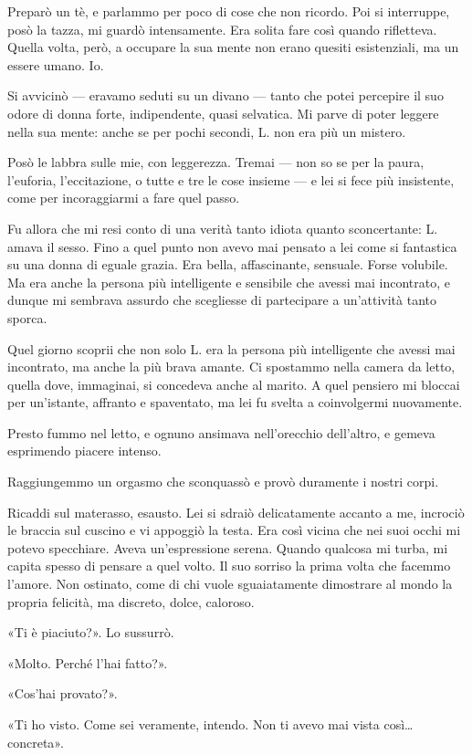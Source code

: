 \documentclass[a4paper,10pt]{memoir}
\begin{document}
Preparò un tè, e parlammo per poco di cose che non ricordo. Poi si interruppe, posò la tazza, mi guardò intensamente.
Era solita fare così quando rifletteva. Quella volta, però, a occupare la sua mente non erano quesiti esistenziali, ma
un essere umano. Io.

Si avvicinò --- eravamo seduti su un divano --- tanto che potei percepire il suo odore di donna forte, indipendente,
quasi selvatica. Mi parve di poter leggere nella sua mente: anche se per pochi secondi, L. non era più un mistero.

Posò le labbra sulle mie, con leggerezza. Tremai --- non so se per la paura, l'euforia, l'eccitazione, o tutte e tre le
cose insieme --- e lei si fece più insistente, come per incoraggiarmi a fare quel passo.

Fu allora che mi resi conto di una verità tanto idiota quanto sconcertante: L. amava il sesso. Fino a quel punto non
avevo mai pensato a lei come si fantastica su una donna di eguale grazia. Era bella, affascinante, sensuale. Forse
volubile. Ma era anche la persona più intelligente e sensibile che avessi mai incontrato, e dunque mi sembrava assurdo
che scegliesse di partecipare a un'attività tanto sporca.

Quel giorno scoprii che non solo L. era la persona più intelligente che avessi mai incontrato, ma anche la più brava
amante. Ci spostammo nella camera da letto, quella dove, immaginai, si concedeva anche al marito. A quel pensiero mi
bloccai per un'istante, affranto e spaventato, ma lei fu svelta a coinvolgermi nuovamente.

Presto fummo nel letto, e ognuno ansimava nell'orecchio dell'altro, e gemeva esprimendo piacere intenso.

Raggiungemmo un orgasmo che sconquassò e provò duramente i nostri corpi.

Ricaddi sul materasso, esausto. Lei si sdraiò delicatamente accanto a me, incrociò le braccia sul cuscino e vi appoggiò
la testa. Era così vicina che nei suoi occhi mi potevo specchiare. Aveva un'espressione serena. Quando qualcosa mi
turba, mi capita spesso di pensare a quel volto. Il suo sorriso la prima volta che facemmo l'amore. Non ostinato, come
di chi vuole sguaiatamente dimostrare al mondo la propria felicità, ma discreto, dolce, caloroso.

«Ti è piaciuto?». Lo sussurrò.

«Molto. Perché l'hai fatto?».

«Cos'hai provato?».

«Ti ho visto. Come sei veramente, intendo. Non ti avevo mai vista così\dots{} concreta».
\end{document}
